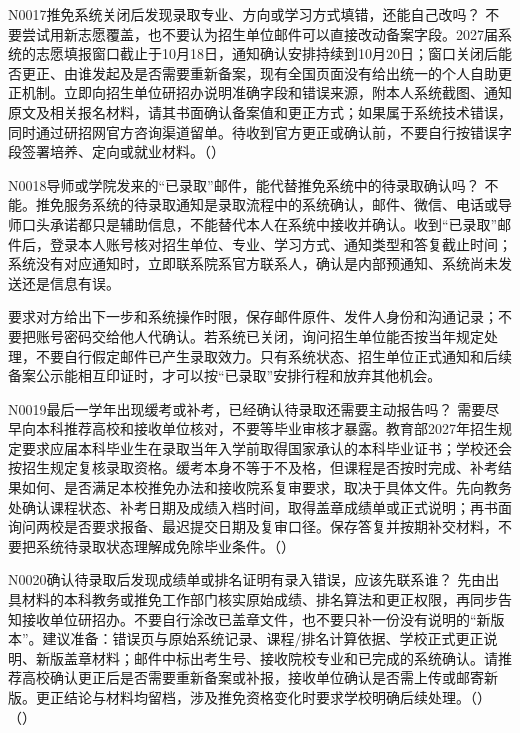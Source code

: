 \begin{qa}{N0017}{推免系统关闭后发现录取专业、方向或学习方式填错，还能自己改吗？}
不要尝试用新志愿覆盖，也不要认为招生单位邮件可以直接改动备案字段。2027届系统的志愿填报窗口截止于10月18日，通知确认安排持续到10月20日；窗口关闭后能否更正、由谁发起及是否需要重新备案，现有全国页面没有给出统一的个人自助更正机制。立即向招生单位研招办说明准确字段和错误来源，附本人系统截图、通知原文及相关报名材料，请其书面确认备案值和更正方式；如果属于系统技术错误，同时通过研招网官方咨询渠道留单。待收到官方更正或确认前，不要自行按错误字段签署培养、定向或就业材料。（）
\end{qa}
\begin{qa}{N0018}{导师或学院发来的“已录取”邮件，能代替推免系统中的待录取确认吗？}
不能。推免服务系统的待录取通知是录取流程中的系统确认，邮件、微信、电话或导师口头承诺都只是辅助信息，不能替代本人在系统中接收并确认。收到“已录取”邮件后，登录本人账号核对招生单位、专业、学习方式、通知类型和答复截止时间；系统没有对应通知时，立即联系院系官方联系人，确认是内部预通知、系统尚未发送还是信息有误。

要求对方给出下一步和系统操作时限，保存邮件原件、发件人身份和沟通记录；不要把账号密码交给他人代确认。若系统已关闭，询问招生单位能否按当年规定处理，不要自行假定邮件已产生录取效力。只有系统状态、招生单位正式通知和后续备案公示能相互印证时，才可以按“已录取”安排行程和放弃其他机会。
\end{qa}
\begin{qa}{N0019}{最后一学年出现缓考或补考，已经确认待录取还需要主动报告吗？}
需要尽早向本科推荐高校和接收单位核对，不要等毕业审核才暴露。教育部2027年招生规定要求应届本科毕业生在录取当年入学前取得国家承认的本科毕业证书；学校还会按招生规定复核录取资格。缓考本身不等于不及格，但课程是否按时完成、补考结果如何、是否满足本校推免办法和接收院系复审要求，取决于具体文件。先向教务处确认课程状态、补考日期及成绩入档时间，取得盖章成绩单或正式说明；再书面询问两校是否要求报备、最迟提交日期及复审口径。保存答复并按期补交材料，不要把系统待录取状态理解成免除毕业条件。（）
\end{qa}
\begin{qa}{N0020}{确认待录取后发现成绩单或排名证明有录入错误，应该先联系谁？}
先由出具材料的本科教务或推免工作部门核实原始成绩、排名算法和更正权限，再同步告知接收单位研招办。不要自行涂改已盖章文件，也不要只补一份没有说明的“新版本”。建议准备：错误页与原始系统记录、课程/排名计算依据、学校正式更正说明、新版盖章材料；邮件中标出考生号、接收院校专业和已完成的系统确认。请推荐高校确认更正后是否需要重新备案或补报，接收单位确认是否需上传或邮寄新版。更正结论与材料均留档，涉及推免资格变化时要求学校明确后续处理。（） （）
\end{qa}
